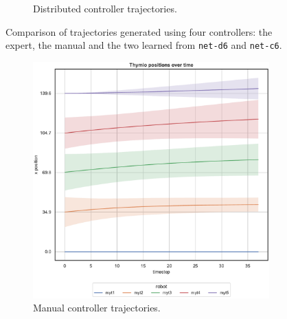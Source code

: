 \begin{figure}[!htb]
\begin{center}
\begin{subfigure}[h]{0.49\textwidth}
			\caption{Distributed controller trajectories.}
		\end{subfigure}
	\end{center}
	\vspace{-0.5cm}
	\caption[Evaluation of the trajectories learned by \texttt{net-c6}.]{Comparison 
		of trajectories generated using four controllers: the expert, the manual and 
		the two learned from \texttt{net-d6} and \texttt{net-c6}.}	
\end{figure}

\medskip
\begin{figure}[!htb]\ContinuedFloat
	\begin{center}
		\begin{subfigure}[h]{0.49\textwidth}
			\centering			
			\includegraphics[width=\textwidth]{contents/images/net-d6/position-overtime-manual}%
			\caption{Manual controller trajectories.}
		\end{subfigure}
		\hfill
		\begin{subfigure}[h]{0.49\textwidth}
			\centering

\end{subfigure}
\end{center}
\end{figure}
